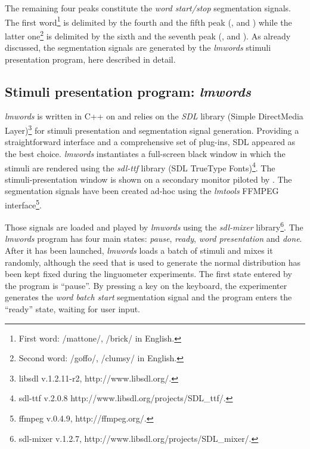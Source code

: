 The remaining four peaks constitute the \emph{word start/stop} segmentation
signals.
The first word\footnote{First word: /mattone/, /brick/ in English.}
is delimited by the fourth and the fifth peak
(, and )
while the latter one\footnote{Second word: /goffo/, /clumsy/ in English.}
is delimited by the sixth and the seventh peak 
(, and ).
As already discussed, the segmentation signals are generated by the
\emph{lmwords} stimuli presentation program, here described in detail.
\subsection{Stimuli presentation program: \emph{lmwords}}
\label{sec:linguometer:technical:lmwords}
\emph{lmwords} is written in C++ on and relies on the \emph{SDL} library (Simple
DirectMedia Layer)\footnote{libsdl v.1.2.11-r2, http://www.libsdl.org/.} 
for stimuli presentation and segmentation signal generation.
Providing a straightforward interface and a comprehensive set of plug-ins, 
SDL appeared as the best choice.
\emph{lmwords} instantiates a full-screen black window in which the stimuli are
rendered using the \emph{sdl-ttf} library (SDL TrueType Fonts)\footnote{sdl-ttf 
v.2.0.8 http://www.libsdl.org/projects/SDL\_ttf/.}.
The stimuli-presentation window is shown on a secondary monitor piloted by
. The segmentation signals have been created ad-hoc using the \emph{lmtools} FFMPEG interface\footnote{ffmpeg v.0.4.9, http://ffmpeg.org/.}.

Those signals are loaded and played by \emph{lmwords} using the \emph{sdl-mixer}
library\footnote{sdl-mixer v.1.2.7, http://www.libsdl.org/projects/SDL\_mixer/.}.
The \emph{lmwords} program has four main states: \emph{pause}, \emph{ready},
\emph{word presentation} and \emph{done}.
After it has been launched, \emph{lmwords} loads a batch of stimuli and mixes it
randomly, although the seed that is used to generate the normal distribution has
been kept fixed during the linguometer experiments.
The first state entered by the program is ``pause''. By pressing a key on
the  keyboard, the experimenter generates the \emph{word batch start}
segmentation signal and the program enters the ``ready'' state, waiting for
user input.

